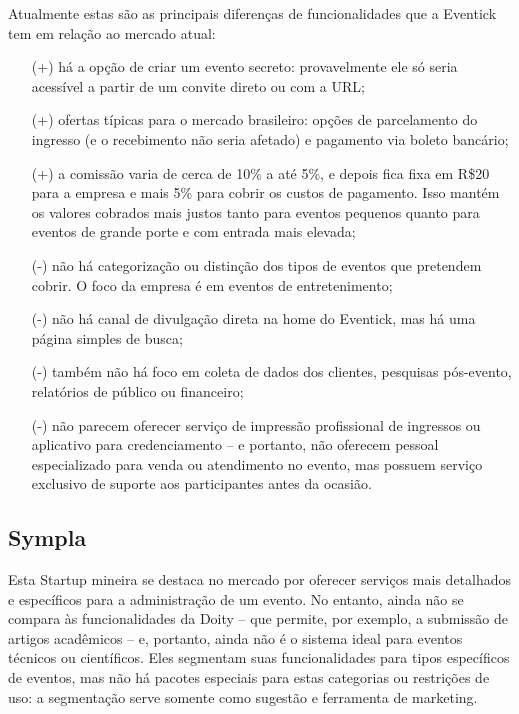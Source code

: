 \documentclass[12pt,a4paper,twoside,hyphens,english,brazil]{abntex2}
\begin{document}
Atualmente estas são as principais diferenças de funcionalidades que a Eventick tem em relação ao mercado atual:
\begin{itemize}[itemsep=-0.5ex]
	\item[(+)] há a opção de criar um evento secreto: provavelmente ele só seria acessível a partir de um convite direto ou com a URL;
	\item[(+)] ofertas típicas para o mercado brasileiro: opções de parcelamento do ingresso (e o recebimento não seria afetado) e pagamento via boleto bancário;
	\item[(+)] a comissão varia de cerca de 10\% a até 5\%, e depois fica fixa em R\$20 para a empresa e mais 5\% para cobrir os custos de pagamento. Isso mantém os valores cobrados mais justos tanto para eventos pequenos quanto para eventos de grande porte e com entrada mais elevada;
	\item[(-)] não há categorização ou distinção dos tipos de eventos que pretendem cobrir. O foco da empresa é em eventos de entretenimento;
	\item[(-)] não há canal de divulgação direta na home do Eventick, mas há uma página simples de busca;
	\item[(-)] também não há foco em coleta de dados dos clientes, pesquisas pós-evento, relatórios de público ou financeiro;
	\item[(-)] não parecem oferecer serviço de impressão profissional de ingressos ou aplicativo para credenciamento -- e portanto, não oferecem pessoal especializado para venda ou atendimento no evento, mas possuem serviço exclusivo de suporte aos participantes antes da ocasião.
\end{itemize}


\subsection{Sympla}
Esta Startup mineira se destaca no mercado por oferecer serviços mais detalhados e específicos para a administração de um evento. No entanto, ainda não se compara às funcionalidades da Doity -- que permite, por exemplo, a submissão de artigos acadêmicos -- e, portanto, ainda não é o sistema ideal para eventos técnicos ou científicos. Eles segmentam suas funcionalidades para tipos específicos de eventos, mas não há pacotes especiais para estas categorias ou restrições de uso: a segmentação serve somente como sugestão e ferramenta de marketing.
\end{document}

